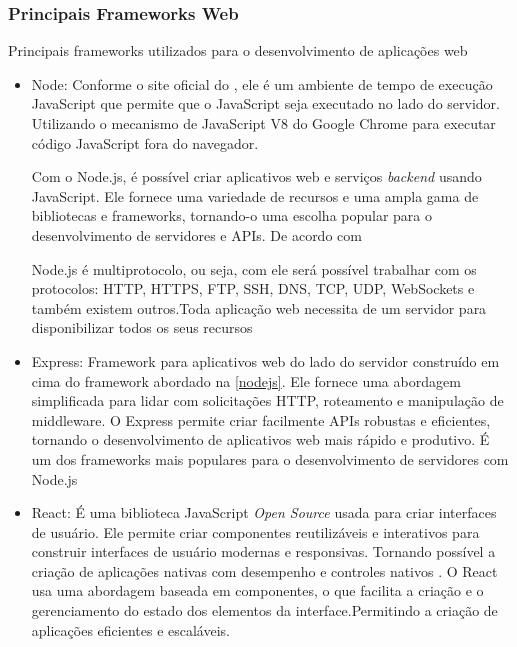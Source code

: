 \subsubsection{Principais Frameworks Web}
Principais frameworks utilizados para o desenvolvimento de aplicações web 
\begin{itemize}\label{nodejs}
    \item Node: Conforme o site oficial do \cite{Nodejs}, ele é um ambiente de tempo de execução JavaScript que permite que o JavaScript seja executado no lado do servidor. Utilizando o mecanismo de JavaScript V8 do Google Chrome para executar código JavaScript fora do navegador.
	
    Com o Node.js, é possível criar aplicativos web e serviços \textit{backend} usando JavaScript. Ele fornece uma variedade de recursos e uma ampla gama de bibliotecas e frameworks, tornando-o uma escolha popular para o desenvolvimento de servidores e APIs. \cite{Nodejs}
    De acordo com 
    \begin{citacao}
        \cite{pereira2014aplicações} 
        Node.js é multiprotocolo, ou seja, com ele será possível trabalhar com os protocolos: HTTP, HTTPS, FTP, SSH, DNS, TCP, UDP, WebSockets e também existem outros.Toda aplicação web necessita de um servidor para disponibilizar todos os seus  recursos
    \end{citacao}

    \item Express: Framework para aplicativos web do lado do servidor construído em cima do framework abordado na \autoref{nodejs}. 
     Ele fornece uma abordagem simplificada para lidar com solicitações HTTP, roteamento e manipulação de middleware. 
	 O Express permite criar facilmente APIs robustas e eficientes, tornando o desenvolvimento de aplicativos web mais rápido e produtivo. É um dos frameworks mais populares para o desenvolvimento de servidores com Node.js 
     \cite{pereira2014aplicações}
    \item React: É uma biblioteca JavaScript \textit{Open Source} usada para criar interfaces de usuário. Ele permite criar componentes reutilizáveis e interativos para construir interfaces de usuário modernas e responsivas.  Tornando possível a criação de aplicações nativas com desempenho e controles nativos \cite{ReactMet54}.
    O React usa uma abordagem baseada em componentes, o que facilita a criação e o gerenciamento do estado dos elementos da interface.Permitindo a criação de aplicações eficientes e escaláveis.\cite{ReactMet54}
\end{itemize}

